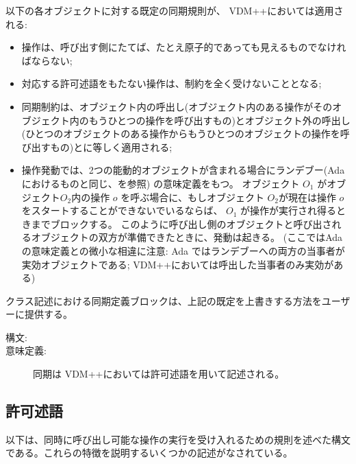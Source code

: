\documentclass[\pformat,12pt]{jarticle}
\newcommand{\vdmpp}{VDM++}
\begin{document}
以下の各オブジェクトに対する既定の同期規則が、 {\vdmpp}においては適用される:
\begin{itemize}
\item 操作は、呼び出す側にたてば、たとえ原子的であっても見えるものでなければならない;
\item 対応する許可述語をもたない操作は、制約を全く受けないこととなる;
\item 同期制約は、オブジェクト内の呼出し(オブジェクト内のある操作がそのオブジェクト内のもうひとつの操作を呼び出すもの)とオブジェクト外の呼出し(ひとつのオブジェクトのある操作からもうひとつのオブジェクトの操作を呼び出すもの)とに等しく適用される;
\item 操作発動では、2つの能動的オブジェクトが含まれる場合にランデブー(Adaにおけるものと同じ、\cite{adalrm}を参照) の意味定義をもつ。
オブジェクト $O_1$ がオブジェクト$O_2$内の操作 $o$ を呼ぶ場合に、もしオブジェクト $O_2$が現在は操作 $o$ をスタートすることができないでいるならば、 $O_1$ が操作が実行され得るときまでブロックする。
このように呼び出し側のオブジェクトと呼び出されるオブジェクトの双方が準備できたときに、発動は起きる。
(ここではAdaの意味定義との微小な相違に注意: Ada ではランデブーへの両方の当事者が実効オブジェクトである;  \vdmpp においては呼出した当事者のみ実効がある)
\end{itemize}
クラス記述における同期定義ブロックは、上記の既定を上書きする方法をユーザーに提供する。

\begin{description}
\item[構文:] 

\item[意味定義:] 

同期は \vdmpp においては許可述語を用いて記述される。

\end{description}


\subsection{許可述語}
\label{sec:permissionpred}

以下は、同時に呼び出し可能な操作の実行を受け入れるための規則を述べた構文である。これらの特徴を説明するいくつかの記述がなされている。
\end{document}
